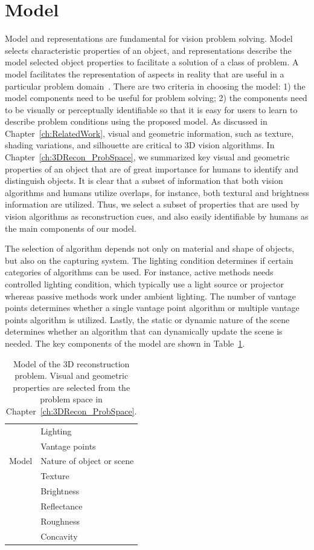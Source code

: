 \section{Model}
\label{sec:3DRecon_Model}
Model and representations are fundamental for vision problem solving. Model selects characteristic properties of an object, and representations describe the model selected object properties to facilitate a solution of a class of problem. A model facilitates the representation of aspects in reality that are useful in a particular problem domain~\cite{bolles19863dpo}. There are two criteria in choosing the model: 1) the model components need to be useful for problem solving; 2) the components need to be visually or perceptually identifiable so that it is easy for users to learn to describe problem conditions using the proposed model. As discussed in Chapter~\ref{ch:RelatedWork}, visual and geometric information, such as texture, shading variations, and silhouette are critical to 3D vision algorithms. In Chapter~\ref{ch:3DRecon_ProbSpace}, we summarized key visual and geometric properties of an object that are of great importance for humans to identify and distinguish objects. It is clear that a subset of information that both vision algorithms and humans utilize overlaps, for instance, both textural and brightness information are utilized. Thus, we select a subset of properties that are used by vision algorithms as reconstruction cues, and also easily identifiable by humans as the main components of our model.

The selection of algorithm depends not only on material and shape of objects, but also on the capturing system. The lighting condition determines if certain categories of algorithms can be used. For instance, active methods needs controlled lighting condition, which typically use a light source or projector whereas passive methods work under ambient lighting. The number of vantage points determines whether a single vantage point algorithm or multiple vantage points algorithm is utilized. Lastly, the static or dynamic nature of the scene determines whether an algorithm that can dynamically update the scene is needed. The key components of the model are shown in Table~\ref{tab:3DRecon_model}.
\begin{table}[!htbp]
  \centering
  \begin{tabular}{l|l}
  \toprule
  \multirow{5}{*}{Model} 
  & Lighting \\
  & Vantage points \\
  & Nature of object or scene \\
  & Texture \\
  & Brightness \\
  & Reflectance \\
  & Roughness \\
  & Concavity \\
  \bottomrule
  \end{tabular}
  \caption{Model of the 3D reconstruction problem. Visual and geometric properties are selected from the problem space in Chapter~\ref{ch:3DRecon_ProbSpace}.}
  \label{tab:3DRecon_model}
\end{table}

